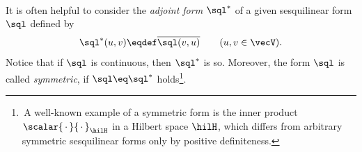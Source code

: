 \documentclass[11pt,twoside]{article}
\begin{document}

\paragraph{} %
It is often helpful to consider the \textit{adjoint form} $\sql^*$
of a given sesquilinear form $\sql$ defined by
\[
\sql^* (u,v) \eqdef \overline{\sql(v,u)}
\quad \quad (u,v \in \vecV).
\]
Notice that if $\sql$ is continuous,
then $\sql^*$ is so.
Moreover,
the form $\sql$ is called \textit{symmetric},
if $\sql \eq \sql^*$ holds\footnote{
\,A well-known example of a symmetric form is the inner product
$\scalar{\,\cdot\,}{\,\cdot\,}_{\hilH}$ in a Hilbert space $\hilH$,
which differs from arbitrary symmetric sesquilinear forms
only by positive definiteness.}.
\end{document}
